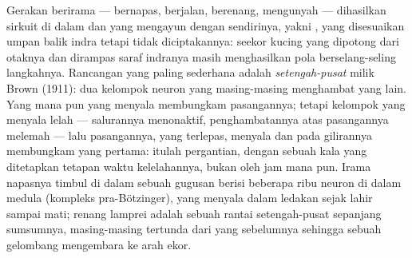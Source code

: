 \begin{proposition}\label{prop:b3:nervous-systems:cpg}
Gerakan berirama --- bernapas, berjalan, berenang, mengunyah --- dihasilkan
sirkuit di dalam  dan  yang mengayun dengan
sendirinya, yakni \emph{}, yang disesuaikan umpan balik
indra tetapi tidak diciptakannya:  seekor kucing yang
dipotong dari otaknya dan dirampas saraf indranya masih menghasilkan pola
berselang-seling langkahnya. Rancangan yang paling sederhana adalah
\emph{setengah-pusat} milik Brown (1911): dua kelompok neuron yang masing-masing
menghambat yang lain. Yang mana pun yang menyala membungkam pasangannya; tetapi
kelompok yang menyala lelah --- salurannya menonaktif, penghambatannya atas
pasangannya melemah --- lalu pasangannya, yang terlepas, menyala dan pada
gilirannya membungkam yang pertama: itulah pergantian, dengan sebuah kala yang
ditetapkan tetapan waktu kelelahannya, bukan oleh jam mana pun. Irama napasnya
timbul di dalam sebuah gugusan berisi beberapa ribu neuron di dalam medula
(kompleks pra-Bötzinger), yang menyala dalam ledakan sejak lahir sampai mati;
renang lamprei adalah sebuah rantai setengah-pusat sepanjang sumsumnya,
masing-masing tertunda dari yang sebelumnya sehingga sebuah gelombang mengembara ke arah ekor.
\end{proposition}

